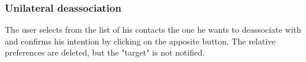 \subsubsection{Unilateral deassociation} 
\small{The user selects from the list of his contacts the one he wants to deassociate with and confirms his intention by clicking on the apposite button. The relative preferences are deleted, but the "target" is not notified.}